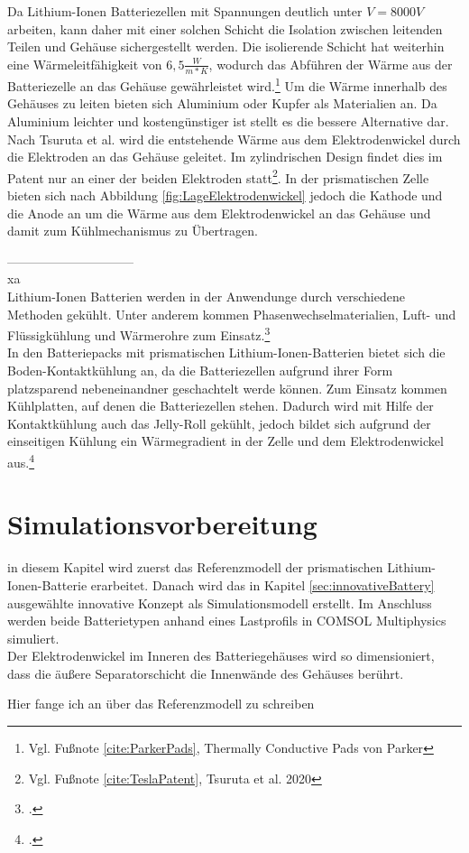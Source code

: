 Da Lithium-Ionen Batteriezellen mit Spannungen deutlich unter $V = 8000 V$ arbeiten, kann daher mit einer solchen Schicht die Isolation zwischen leitenden Teilen und Gehäuse sichergestellt werden. Die isolierende Schicht hat weiterhin eine Wärmeleitfähigkeit von $6,5 \frac{W}{m * K}$, wodurch das Abführen der Wärme aus der Batteriezelle an das Gehäuse gewährleistet wird.\footnote{Vgl. Fußnote \ref{cite:ParkerPads}, Thermally Conductive Pads von Parker} Um die Wärme innerhalb des Gehäuses zu leiten bieten sich Aluminium oder Kupfer als Materialien an. Da Aluminium leichter und kostengünstiger ist stellt es die bessere Alternative dar.\\
Nach Tsuruta et al. wird die entstehende Wärme aus dem Elektrodenwickel durch die Elektroden an das Gehäuse geleitet. Im zylindrischen Design findet dies im Patent nur an einer der beiden Elektroden statt\footnote{Vgl. Fußnote \ref{cite:TeslaPatent}, Tsuruta et al. 2020}. In der prismatischen Zelle bieten sich nach Abbildung \ref{fig:LageElektrodenwickel} jedoch die Kathode und die Anode an um die Wärme aus dem Elektrodenwickel an das Gehäuse und damit zum Kühlmechanismus zu Übertragen.






\newpage
------------------------------\\
xa\\%
Lithium-Ionen Batterien werden in der Anwendunge durch verschiedene Methoden gekühlt. Unter anderem kommen Phasenwechselmaterialien, Luft- und Flüssigkühlung und Wärmerohre zum Einsatz.\footcite[Vgl.][S. 1,2]{Mohammed.2018}\\
In den Batteriepacks mit prismatischen Lithium-Ionen-Batterien bietet sich die Boden-Kontaktkühlung an, da die Batteriezellen aufgrund ihrer Form platzsparend nebeneinandner geschachtelt werde können. Zum Einsatz kommen Kühlplatten, auf denen die Batteriezellen stehen. %
Dadurch wird mit Hilfe der Kontaktkühlung auch das Jelly-Roll gekühlt, jedoch bildet sich aufgrund der einseitigen Kühlung ein Wärmegradient in der Zelle und dem Elektrodenwickel aus.\footcite[Vgl.][S. 2107]{Inui.2007}

\newpage
\section{Simulationsvorbereitung}\label{sec:SimulationPREP}

in diesem Kapitel wird zuerst das Referenzmodell der prismatischen Lithium-Ionen-Batterie erarbeitet. Danach wird das in Kapitel \ref{sec:innovativeBattery} ausgewählte innovative Konzept als Simulationsmodell erstellt. Im Anschluss werden beide Batterietypen anhand eines Lastprofils in COMSOL Multiphysics\textsuperscript{\textregistered} simuliert.\\



Der Elektrodenwickel im Inneren des Batteriegehäuses wird so dimensioniert, dass die äußere Separatorschicht die Innenwände des Gehäuses berührt.

Hier fange ich an über das Referenzmodell zu schreiben


	